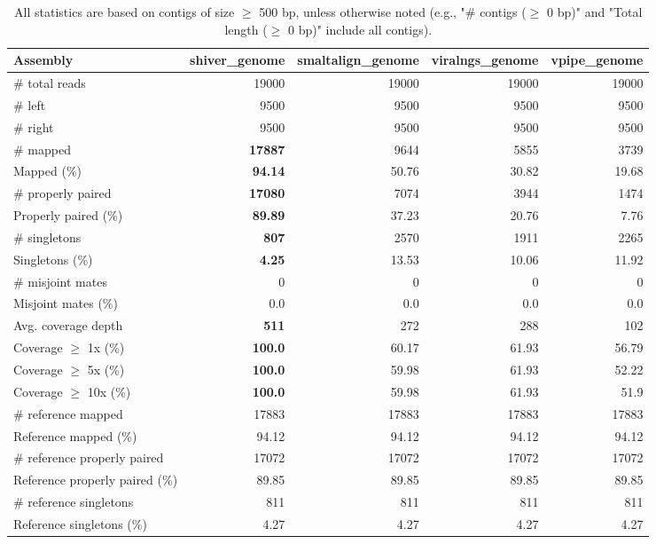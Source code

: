 \documentclass[12pt,a4paper]{article}
\begin{document}
\begin{table}[ht]
\begin{center}
\caption{All statistics are based on contigs of size $\geq$ 500 bp, unless otherwise noted (e.g., "\# contigs ($\geq$ 0 bp)" and "Total length ($\geq$ 0 bp)" include all contigs).}
\begin{tabular}{|l*{4}{|r}|}
\hline
Assembly & shiver\_genome & smaltalign\_genome & viralngs\_genome & vpipe\_genome \\ \hline
\# total reads & 19000 & 19000 & 19000 & 19000 \\ \hline
\# left & 9500 & 9500 & 9500 & 9500 \\ \hline
\# right & 9500 & 9500 & 9500 & 9500 \\ \hline
\# mapped & {\bf 17887} & 9644 & 5855 & 3739 \\ \hline
Mapped (\%) & {\bf 94.14} & 50.76 & 30.82 & 19.68 \\ \hline
\# properly paired & {\bf 17080} & 7074 & 3944 & 1474 \\ \hline
Properly paired (\%) & {\bf 89.89} & 37.23 & 20.76 & 7.76 \\ \hline
\# singletons & {\bf 807} & 2570 & 1911 & 2265 \\ \hline
Singletons (\%) & {\bf 4.25} & 13.53 & 10.06 & 11.92 \\ \hline
\# misjoint mates & 0 & 0 & 0 & 0 \\ \hline
Misjoint mates (\%) & 0.0 & 0.0 & 0.0 & 0.0 \\ \hline
Avg. coverage depth & {\bf 511} & 272 & 288 & 102 \\ \hline
Coverage $\geq$ 1x (\%) & {\bf 100.0} & 60.17 & 61.93 & 56.79 \\ \hline
Coverage $\geq$ 5x (\%) & {\bf 100.0} & 59.98 & 61.93 & 52.22 \\ \hline
Coverage $\geq$ 10x (\%) & {\bf 100.0} & 59.98 & 61.93 & 51.9 \\ \hline
\# reference mapped & 17883 & 17883 & 17883 & 17883 \\ \hline
Reference mapped (\%) & 94.12 & 94.12 & 94.12 & 94.12 \\ \hline
\# reference properly paired & 17072 & 17072 & 17072 & 17072 \\ \hline
Reference properly paired (\%) & 89.85 & 89.85 & 89.85 & 89.85 \\ \hline
\# reference singletons & 811 & 811 & 811 & 811 \\ \hline
Reference singletons (\%) & 4.27 & 4.27 & 4.27 & 4.27 \\ \hline

\end{tabular}
\end{center}
\end{table}
\end{document}
